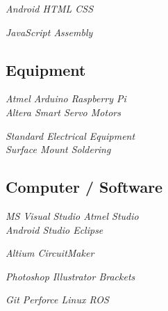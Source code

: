 \documentclass[]{aftab-resume}
\begin{document}
\begin{minipage}[t]{0.33\textwidth}
\it{\textbullet{} Android \textbullet{} HTML \textbullet{} CSS \\}
\vspace{0.05cm}

\it{\textbullet{} JavaScript \textbullet{} Assembly \\}

\sectionsep


\subsection{Equipment}
\vspace{0.01cm}

\it{\textbullet{} Atmel \textbullet{} Arduino \textbullet{} Raspberry Pi \\}
\it{\textbullet{} Altera \textbullet{} Smart Servo Motors \\}
\vspace{0.05cm}

\it{\textbullet{} Standard Electrical Equipment \\}
\it{\textbullet{} Surface Mount Soldering \\}
\sectionsep


\subsection{Computer / Software}
\vspace{0.01cm}

\it{\textbullet{} MS Visual Studio \textbullet{} Atmel Studio \\}
\it{\textbullet{} Android Studio \textbullet{} Eclipse \\}
\vspace{0.075cm}

\it{\textbullet{} Altium \textbullet{} CircuitMaker \\}
\vspace{0.075cm}

\it{\textbullet{} Photoshop \textbullet{} Illustrator \textbullet{} Brackets \\}
\vspace{0.075cm}

\it{\textbullet{} Git \textbullet{} Perforce \textbullet{} Linux \textbullet{} ROS \\}


\end{minipage}
\end{document}
